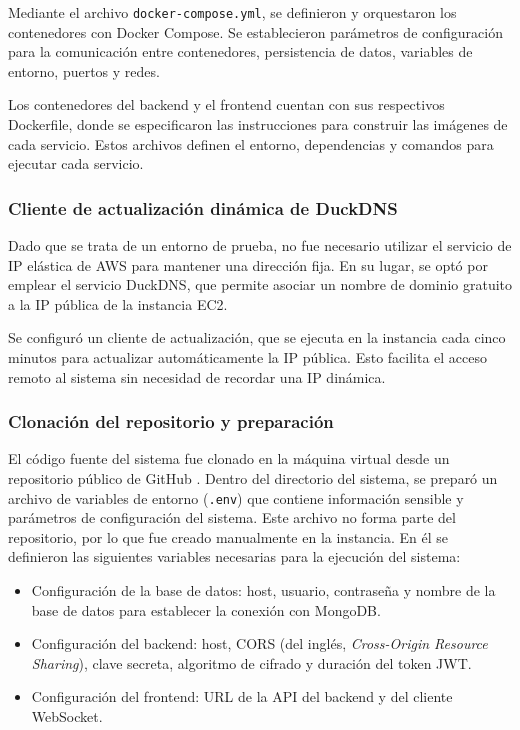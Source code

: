 Mediante el archivo \texttt{docker-compose.yml}, se definieron y orquestaron
los contenedores con Docker Compose. Se establecieron parámetros de
configuración para la comunicación entre contenedores, persistencia de datos,
variables de entorno, puertos y redes.

Los contenedores del backend y el frontend cuentan con sus respectivos
Dockerfile, donde se especificaron las instrucciones para construir las
imágenes de cada servicio. Estos archivos definen el entorno, dependencias y
comandos para ejecutar cada servicio.

\subsubsection{Cliente de actualización dinámica de DuckDNS}

Dado que se trata de un entorno de prueba, no fue necesario utilizar el
servicio de IP elástica de AWS para mantener una dirección fija. En su lugar,
se optó por emplear el servicio DuckDNS, que permite asociar un nombre de
dominio gratuito a la IP pública de la instancia EC2.

Se configuró un cliente de actualización, que se ejecuta en la instancia cada
cinco minutos para actualizar automáticamente la IP pública. Esto facilita el
acceso remoto al sistema sin necesidad de recordar una IP dinámica.

\subsubsection{Clonación del repositorio y preparación}

El código fuente del sistema fue clonado en la máquina virtual desde un
repositorio público de GitHub \cite{EnviroSenseIoT}. Dentro del directorio del
sistema, se preparó un archivo de variables de entorno (\texttt{.env}) que
contiene información sensible y parámetros de configuración del sistema. Este
archivo no forma parte del repositorio, por lo que fue creado manualmente en la
instancia. En él se definieron las siguientes variables necesarias para la
ejecución del sistema:

\begin{itemize}
    \item Configuración de la base de datos: host, usuario, contraseña y nombre de la
          base de datos para establecer la conexión con MongoDB.
    \item Configuración del backend: host, CORS (del inglés, \textit{Cross-Origin
              Resource Sharing}), clave secreta, algoritmo de cifrado y duración del token
          JWT.
    \item Configuración del frontend: URL de la API del backend y del cliente WebSocket.
\end{itemize}

